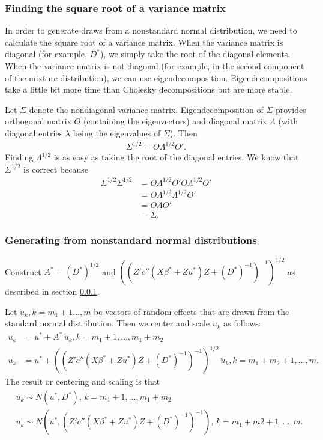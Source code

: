 \documentclass{article}
\begin{document}
\subsubsection{Finding the square root of a variance matrix}\label{sec:sqrtmat}
In order to generate draws from a nonstandard normal distribution, we need to calculate the square root of a variance matrix. When the variance matrix is diagonal (for example, $D^*$), we simply take the root of the diagonal elements.  When the variance matrix is not diagonal (for example, in the second component of the mixture distribution), we can use eigendecomposition. Eigendecompositions take a little bit more time than Cholesky decompositions but are more stable. 

Let $\Sigma$ denote the nondiagonal variance matrix. Eigendecomposition of $\Sigma$ provides orthogonal matrix $O$ (containing the eigenvectors) and diagonal matrix $\Lambda$ (with diagonal entries $\lambda$ being the eigenvalues of $\Sigma$).  Then
\begin{align}
\Sigma^{1/2}= O \Lambda^{1/2} O'.
\end{align}
Finding $\Lambda^{1/2}$ is as easy as taking the root of the diagonal entries.  We know that $\Sigma^{1/2}$ is correct because
\begin{align}
\Sigma^{1/2} \Sigma^{1/2} &= O \Lambda^{1/2} O'O \Lambda^{1/2} O'\\ \nonumber
&= O \Lambda^{1/2}\Lambda^{1/2} O'\\\nonumber
&=O \Lambda O' \\\nonumber
&= \Sigma.
\end{align}

\subsubsection{Generating from nonstandard normal distributions}\label{sec:gennonstand}
 Construct $A^*=(D^*)^{1/2}$ and $((Z'  c''(X \beta^*+Zu^*) Z +(D^*)^{-1}   )^{-1})^{1/2} $ as described in section \ref{sec:sqrtmat}. 

Let $\breve{u}_k,k=m_1+1\ldots,m$ be vectors of random effects that are drawn from the standard normal distribution. Then we center and scale $\breve{u}_k$ as follows:
\begin{align}
u_k&= u^*+A^* \, \breve{u}_k, k=m_1+1,\ldots,m_1+m_2\\
u_k&= u^*+ ((Z'  c''(X \beta^*+Zu^*) Z +(D^*)^{-1}   )^{-1})^{1/2} \,  \breve{u}_k, k=m_1+m_2+1,\ldots,m.
\end{align}
 The result or centering and scaling is that
\begin{align}
 &u_k \sim N(u^*,D^*), \, k=m_1+1,\ldots,m_1+m_2\\
& u_k \sim N(u^*,(Z'  c''(X \beta^*+Zu^*) Z +(D^*)^{-1}   )^{-1}), \, k=m_1+m2+1,\ldots,m .
\end{align}
\end{document}
